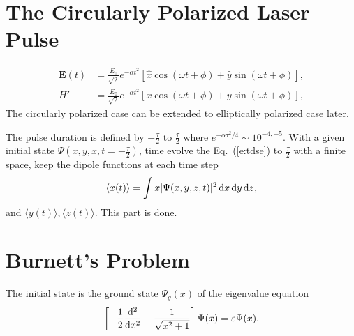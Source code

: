\documentclass{isildur}
\begin{document}
\section{The Circularly Polarized Laser Pulse}

\begin{align}
  \mathbf{E}(t) &=
    \frac{E_0}{\sqrt 2}e^{-\alpha t^2}
    \left[
      {\hat x}\cos(\omega t+\phi)+{\hat y}\sin(\omega t+\phi)
    \right], \\
  H' &= \frac{E_0}{\sqrt 2}e^{-\alpha t^2}
    \left[
      x\cos(\omega t+\phi) + y\sin(\omega t+\phi)
    \right],
\end{align}
%
The circularly polarized case can be extended to elliptically polarized case
later.

The pulse duration is defined by $-\frac{\tau}{2}$ to $\frac{\tau}{2}$ where
$e^{-\alpha \tau^2/4}\sim 10^{-4,-5}$.  With a given initial state
$\Psi(x,y,x,t=-\frac{\tau}{2})$, time evolve the Eq.~(\ref{e:tdse}) to
$\frac{\tau}{2}$ with a finite space, keep the dipole functions at each time
step
%
\begin{align}
  \langle x(t) \rangle = \int x |\Psi(x,y,z,t)|^2 \mathop{}\!\mathrm{d} x \mathop{}\!\mathrm{d} y \mathop{}\!\mathrm{d} z,
\end{align}
%
and $\langle y(t) \rangle, \langle z(t) \rangle$.  This part is done.

\section{Burnett's Problem}

The initial state is the ground state $\Psi_g(x)$ of the eigenvalue equation
%
\begin{align}
  \left[ -\frac{1}{2}\frac{\mathop{}\!\mathrm{d}^2}{\mathop{}\!\mathrm{d} x^2}-\frac{1}{\sqrt{x^2+1}} \right]
  \Psi(x) = \varepsilon \Psi(x).
\end{align}
\end{document}
